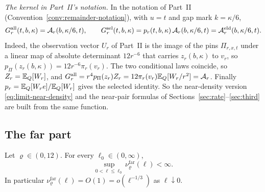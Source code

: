 \emph{The kernel in Part~II's notation.} In the notation of Part~II (Convention~\ref{conv:remainder-notation}), with $u=t$ and gap mark $k=\kappa/6$,
\[
G^{\mathrm{all}}_r(t,b,\kappa)=\mathcal A_r(b,\kappa/6,t),\qquad G^{\mathrm{sel}}_r(t,b,\kappa)=p_r(t,b,\kappa)\,\mathcal A_r(b,\kappa/6,t)=\mathcal A^{\mathrm{eld}}_r(b,\kappa/6,t).
\]
Indeed, the observation vector $U_r$ of Part~II is the image of the pins $\Pi_{r,x,t}$ under a linear map of absolute determinant $12r^{-6}$ that carries $z_r(b,\kappa)$ to $v_r$, so $p_\Pi(z_r(b,\kappa))=12r^{-6}\pi_r(v_r)$. The two conditional laws coincide, so $Z_r=\mathbb E_Q[W_r]$, and $G^{\mathrm{all}}_r=r^4p_\Pi(z_r)Z_r=12\pi_r(v_r)\mathbb E_Q[W_r/r^2]=\mathcal A_r$. Finally $p_r=\mathbb E_Q[W_re]/\mathbb E_Q[W_r]$ gives the selected identity. So the near-density version \eqref{eq:limit-near-density} and the near-pair formulas of Sections~\ref{sec:rate}--\ref{sec:third} are built from the same function.

\subsection*{The far part}

\begin{proposition}\label{prop:limit-far}
Let $\varrho\in(0,12)$. For every $\ell_0\in(0,\infty)$,
\begin{equation}\label{eq:limit-far-sup}
\sup_{0<\ell\le\ell_0}\nu^{\mathrm{far}}_\varrho(\ell)<\infty .
\end{equation}
In particular $\nu^{\mathrm{far}}_\varrho(\ell)=O(1)=o(\ell^{-1/3})$ as $\ell\downarrow0$.
\end{proposition}

